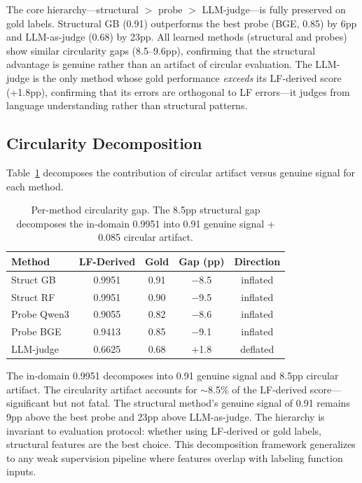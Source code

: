 \documentclass[11pt,a4paper]{article}
\begin{document}
The core hierarchy---structural $>$ probe $>$ LLM-judge---is fully preserved on gold labels. Structural GB (0.91) outperforms the best probe (BGE, 0.85) by 6pp and LLM-as-judge (0.68) by 23pp.
All learned methods (structural and probes) show similar circularity gaps (8.5--9.6pp), confirming that the structural advantage is genuine rather than an artifact of circular evaluation.
The LLM-judge is the only method whose gold performance \emph{exceeds} its LF-derived score (+1.8pp), confirming that its errors are orthogonal to LF errors---it judges from language understanding rather than structural patterns.

\subsection{Circularity Decomposition}
\label{sec:circularity}

Table~\ref{tab:circularity} decomposes the contribution of circular artifact versus genuine signal for each method.

\begin{table}[t]
\centering
\small
\begin{tabular}{lcccc}
\toprule
Method & LF-Derived & Gold & Gap (pp) & Direction \\
\midrule
Struct GB & 0.9951 & 0.91 & $-$8.5 & inflated \\
Struct RF & 0.9951 & 0.90 & $-$9.5 & inflated \\
Probe Qwen3 & 0.9055 & 0.82 & $-$8.6 & inflated \\
Probe BGE & 0.9413 & 0.85 & $-$9.1 & inflated \\
LLM-judge & 0.6625 & 0.68 & $+$1.8 & deflated \\
\bottomrule
\end{tabular}
\caption{Per-method circularity gap. The 8.5pp structural gap decomposes the in-domain 0.9951 into 0.91 genuine signal + 0.085 circular artifact.}
\label{tab:circularity}
\end{table}

The in-domain 0.9951 decomposes into 0.91 genuine signal and 8.5pp circular artifact.
The circularity artifact accounts for $\sim$8.5\% of the LF-derived score---significant but not fatal. The structural method's genuine signal of 0.91 remains 9pp above the best probe and 23pp above LLM-as-judge. The hierarchy is invariant to evaluation protocol: whether using LF-derived or gold labels, structural features are the best choice. This decomposition framework generalizes to any weak supervision pipeline where features overlap with labeling function inputs.
\end{document}
